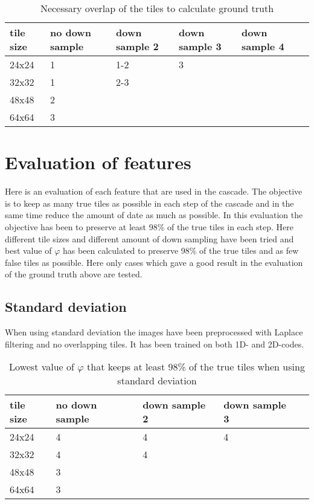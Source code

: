 \begin{table}[H]
\begin{center}
     \begin{tabular}{ | l | l | l | l | l | p{5cm} |}
     \hline
     tile size & no down sample & down sample 2 & down sample 3 & down sample 4 \\ \hline
   	 24x24 & 1 & 1-2 & 3 & 	\\ \hline
     32x32 & 1 & 2-3 &   & 	\\ \hline
     48x48 & 2 &     &   &  \\ \hline
     64x64 & 3 &     &   &	\\ \hline
     \end{tabular}
\end{center}
\caption{Necessary overlap of the tiles to calculate ground truth}
\end{table}

\section{Evaluation of features}
\label{sec:Evaluation of features}
Here is an evaluation of each feature that are used in the cascade. The objective is to keep as many true tiles as possible in each step of the cascade and in the same time reduce the amount of date as much as possible. In this evaluation the objective has been to preserve at least 98\% of the true tiles in each step. Here different tile sizes and different amount of down sampling have been tried and best value of $\varphi$ has been calculated to preserve 98\% of the true tiles and as few false tiles as possible. Here only cases which gave a good result in the evaluation of the ground truth above are tested. 

\subsection{Standard deviation}
When using standard deviation the images have been preprocessed with Laplace filtering and no overlapping tiles. It has been trained on both 1D- and 2D-codes. 

\begin{table}[H]
\begin{center}
     \begin{tabular}{ | l | l | l | l | l |}
     \hline
     tile size & no down sample & down sample 2 & down sample 3 \\ \hline
   	 24x24 & 4 & 4 & 4 			\\ \hline
     32x32 & 4 & 4  & 			\\ \hline
     48x48 & 3 &     &  		\\ \hline
     64x64 & 3 &     &			\\ \hline
     \end{tabular}
\end{center}
\caption{Lowest value of $\varphi$ that keeps at least 98\% of the true tiles when using standard deviation}
\end{table}

